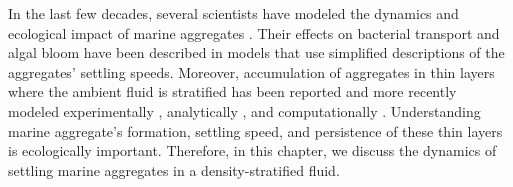 

In the last few decades, several scientists have modeled the dynamics and ecological impact of marine aggregates \cite{jackson_aggregation_1998, kiorboe_mechanisms_2002}. 
Their effects on bacterial transport \cite{jackson_simulation_1989} and algal bloom \cite{jackson_model_1990} have been described in models that use simplified descriptions of the aggregates' settling speeds. Moreover, accumulation of aggregates in thin layers where the ambient fluid is stratified has been reported \cite{macintyre_accumulation_1995, alldredge_occurrence_2002} and more recently modeled experimentally \cite{prairie_delayed_2013}, analytically \cite{camassa_retention_2013}, and computationally \cite{panah_simulations_2017}. 
Understanding marine aggregate's formation, settling speed, and persistence of these thin layers is ecologically important. 
Therefore, in this chapter, we discuss the dynamics of settling marine aggregates in a density-stratified fluid. 
